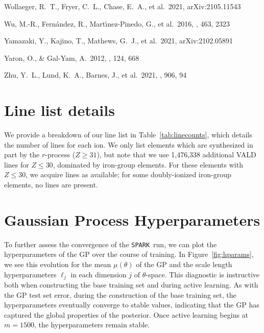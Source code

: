 \documentclass[twocolumn, twocolappendix]{aastex63}
\def\SPARK{\texttt{SPARK}}
\begin{document}
\begin{thebibliography}{}
 Wollaeger, R.~T., Fryer, C.~L., Chase, E.~A., et al.\ 2021, arXiv:2105.11543


 Wu, M.-R., Fern{\'a}ndez, R., Mart{\'\i}nez-Pinedo, G., et al.\ 2016, \mnras, 463, 2323




 Yamazaki, Y., Kajino, T., Mathews, G.~J., et al.\ 2021, arXiv:2102.05891


 Yaron, O., \& Gal-Yam, A.\ 2012, \pasp, 124, 668




 Zhu, Y.~L., Lund, K.~A., Barnes, J., et al.\ 2021, \apj, 906, 94


\end{thebibliography}


\appendix{}

\section{Line list details}\label{app:linelist}

We provide a breakdown of our line list in Table~\ref{tab:linecounts}, which details the number of lines for each ion. We only list elements which are synthesized in part by the $r$-process ($Z \geqslant 31$), but note that we use 1,476,338 additional VALD lines for $Z \leqslant 30$, dominated by iron-group elements. For these elements with $Z \leqslant 30$, we acquire lines as available; for some doubly-ionized iron-group elements, no lines are present.


\section{Gaussian Process Hyperparameters}\label{app:GP_hparams}

To further assess the convergence of the \SPARK~run, we can plot the hyperparameters of the GP over the course of training. In Figure~\ref{fig:hparams}, we see this evolution for the mean $\mu(\theta)$ of the GP and the scale length hyperparameters $\ell_j$ in each dimension $j$ of $\theta$-space. This diagnostic is instructive both when constructing the base training set and during active learning. As with the GP test set error, during the construction of the base training set, the hyperparameters eventually converge to stable values, indicating that the GP has captured the global properties of the posterior. Once active learning begins at $m = 1500$, the hyperparameters remain stable.
\end{document}
